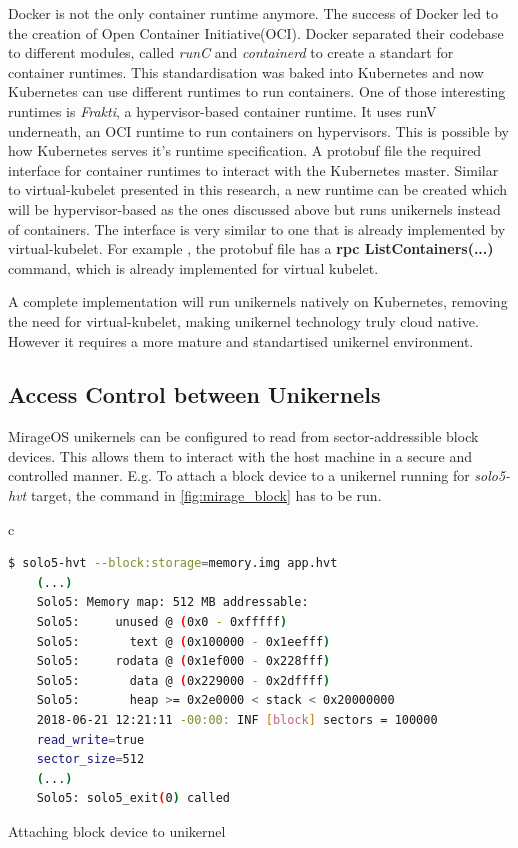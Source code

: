 Docker is not the only container runtime anymore. The success of Docker led to the creation of Open Container Initiative(OCI). Docker separated their codebase to different modules, called \textit{runC} and \textit{containerd} to create a standart for container runtimes. This standardisation was baked into Kubernetes and now Kubernetes can use different runtimes to run containers. One of those interesting runtimes is \textit{Frakti}, a hypervisor-based container runtime. It uses runV underneath, an OCI runtime to run containers on hypervisors. This is possible by how Kubernetes serves it's runtime specification. A protobuf file \cite{protobuf} the required interface for container runtimes to interact with the Kubernetes master. Similar to virtual-kubelet presented in this research, a new runtime can be created which will be hypervisor-based as the ones discussed above but runs unikernels instead of containers. The interface is very similar to one that is already implemented by virtual-kubelet. For example , the protobuf file has a \textbf{rpc ListContainers(...)} command, which is already implemented for virtual kubelet.

A complete implementation will run unikernels natively on Kubernetes, removing the need for virtual-kubelet, making unikernel technology truly cloud native. However it requires a more mature and standartised unikernel environment.

\subsection{Access Control between Unikernels}

MirageOS unikernels can be configured to read from sector-addressible block devices. This allows them to interact with the host machine in a secure and controlled manner. E.g. To attach a block device to a unikernel running for \textit{solo5-hvt} target,  the command in \ref{fig:mirage_block} has to be run.

\begin{code}[htpb]
  \centering
  \begin{tabular}{c}
  \begin{lstlisting}[language=bash]
    $ solo5-hvt --block:storage=memory.img app.hvt
    (...)
    Solo5: Memory map: 512 MB addressable:
    Solo5:     unused @ (0x0 - 0xfffff)
    Solo5:       text @ (0x100000 - 0x1eefff)
    Solo5:     rodata @ (0x1ef000 - 0x228fff)
    Solo5:       data @ (0x229000 - 0x2dffff)
    Solo5:       heap >= 0x2e0000 < stack < 0x20000000
    2018-06-21 12:21:11 -00:00: INF [block] sectors = 100000
    read_write=true
    sector_size=512
    (...)
    Solo5: solo5_exit(0) called
\end{lstlisting}
\end{tabular}
\caption{Attaching block device to unikernel}\label{fig:mirage_block}
\end{code}

